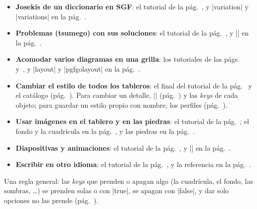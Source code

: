 \begin{itemize}
	\item \textbf{Josekis de un diccionario en SGF}: el tutorial de la pág.~\pageref{tut:josekis}, y |variation| y |variations| en la pág.~\pageref{subsec:sgf}.
	\item \textbf{Problemas (tsumego) con sus soluciones}: el tutorial de la pág.~\pageref{tut:problemas}, y |\sgfproblem| en la pág.~\pageref{subsec:sgfproblemas}.
	\item \textbf{Acomodar varios diagramas en una grilla}: los tutoriales de las págs.~\pageref{tut:partida} y~\pageref{tut:problemas}, y |layout| y |pgfgolayout| en la pág.~\pageref{subsec:disposicion}.
	\item \textbf{Cambiar el estilo de todos los tableros}: el final del tutorial de la pág.~\pageref{tut:posicion} y el catálogo (pág.~\pageref{sec:catalogo}). Para cambiar un detalle, |\pgfgoset| (pág.~\pageref{sec:configuracion}) y las \emph{keys} de cada objeto; para guardar un estilo propio con nombre, los perfiles (pág.~\pageref{subsec:perfiles}).
	\item \textbf{Usar imágenes en el tablero y en las piedras}: el tutorial de la pág.~\pageref{tut:madera}; el fondo y la cuadrícula en la pág.~\pageref{sec:tablero}, y las piedras en la pág.~\pageref{subsec:piedrasimagen}.
	\item \textbf{Diapositivas y animaciones}: el tutorial de la pág.~\pageref{tut:diapositivas}, y |\sgfanimation| en la pág.~\pageref{subsec:sgfanimacion}.
	\item \textbf{Escribir en otro idioma}: el tutorial de la pág.~\pageref{tut:idiomas}, y la referencia en la pág.~\pageref{subsec:idiomas}.
\end{itemize}

Una regla general: las \emph{keys} que prenden o apagan algo (la cuadrícula, el fondo, las sombras, \ldots) se prenden solas o con |true|, se apagan con |false|, y dar solo opciones no las prende (pág.~\pageref{subsec:prender}).
